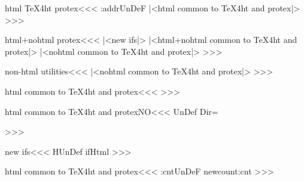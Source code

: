 % 
%
%
%
% 





\<html TeX4ht protex\><<<
\ifx\html:addr\:UnDeF
   |<html common to TeX4ht and protex|>
   \Htmltrue
\fi
>>>

\ifalprotex

\<html+nohtml protex\><<<
|<new ifs|>
|<html+nohtml common to TeX4ht and protex|>
|<nohtml common to TeX4ht and protex|>
>>>

\fi

\<non-html utilities\><<<
|<nohtml common to TeX4ht and protex|>
>>>



\<html common to TeX4ht and protex\><<<
%
>>>




\<html common to TeX4ht and protexNO\><<<
\ifx\HDir\:UnDef \let\HDir=\empty \fi
\let\:HDir=\HDir
\immediate\write16{--- needs --- TeX4ht \ifx\HDir\empty
               \else-d \HDir\space\space\fi \jobname\space ---}%
>>>




\<new ifs\><<<
\ifx \Htmltrue\:UnDef
   \def\:temp{\csname newif\endcsname}
   \expandafter{} \csname ifHtml\endcsname  \Htmlfalse
\fi
>>>


\<html common to TeX4ht and protex\><<<
\ifx\tmp:cnt\:UnDeF    \csname newcount\endcsname\tmp:cnt \fi
\def\g:advance#1{\bgroup \def\:temp{#1}%
                 \tmp:cnt=#1\afterassignment\:gplus \advance\tmp:cnt}
\def\:gplus{\expandafter\xdef\:temp{\the\tmp:cnt}\egroup}
\def\html:lbl{1}
\def\html:addr{\xdef\last:haddr{\file:id-\html:lbl}%
     \g:advance\html:lbl by 1\relax }
>>>

